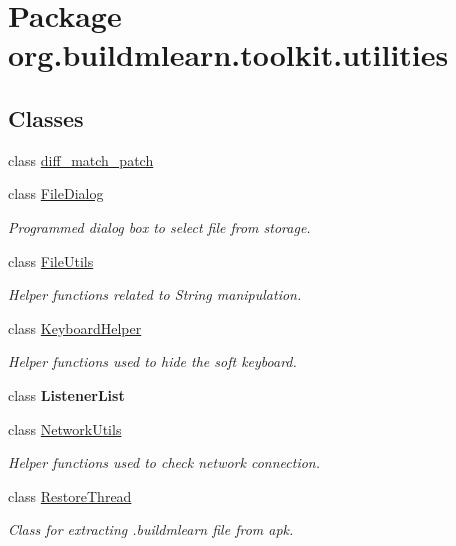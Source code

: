 \hypertarget{namespaceorg_1_1buildmlearn_1_1toolkit_1_1utilities}{}\section{Package org.\+buildmlearn.\+toolkit.\+utilities}
\label{namespaceorg_1_1buildmlearn_1_1toolkit_1_1utilities}
\subsection*{Classes}
\begin{DoxyCompactItemize}
\item 
class \hyperlink{classorg_1_1buildmlearn_1_1toolkit_1_1utilities_1_1diff__match__patch}{diff\+\_\+match\+\_\+patch}
\item 
class \hyperlink{classorg_1_1buildmlearn_1_1toolkit_1_1utilities_1_1FileDialog}{File\+Dialog}
\begin{DoxyCompactList}\small\item\em Programmed dialog box to select file from storage. \end{DoxyCompactList}\item 
class \hyperlink{classorg_1_1buildmlearn_1_1toolkit_1_1utilities_1_1FileUtils}{File\+Utils}
\begin{DoxyCompactList}\small\item\em Helper functions related to String manipulation. \end{DoxyCompactList}\item 
class \hyperlink{classorg_1_1buildmlearn_1_1toolkit_1_1utilities_1_1KeyboardHelper}{Keyboard\+Helper}
\begin{DoxyCompactList}\small\item\em Helper functions used to hide the soft keyboard. \end{DoxyCompactList}\item 
class {\bfseries Listener\+List}
\item 
class \hyperlink{classorg_1_1buildmlearn_1_1toolkit_1_1utilities_1_1NetworkUtils}{Network\+Utils}
\begin{DoxyCompactList}\small\item\em Helper functions used to check network connection. \end{DoxyCompactList}\item 
class \hyperlink{classorg_1_1buildmlearn_1_1toolkit_1_1utilities_1_1RestoreThread}{Restore\+Thread}
\begin{DoxyCompactList}\small\item\em Class for extracting .buildmlearn file from apk. \end{DoxyCompactList}\item 

\end{DoxyCompactItemize}
